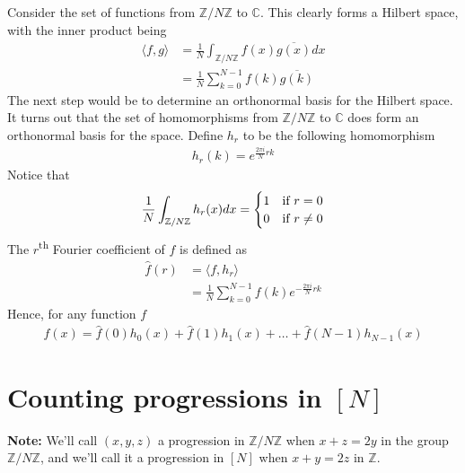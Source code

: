\documentclass[12pt]{article}
\theoremstyle{definition}
\newcommand{\znz}{\mathbb{Z}/N\mathbb{Z}}
\newcommand{\iprod}[2]{\langle #1, #2 \rangle}
\begin{document}
Consider the set of functions from $\znz$ to $\mathbb{C}$. This clearly forms a Hilbert space, with the inner product being
\begin{align*}
   \iprod{f}{g} &= \frac{1}{N} \int_{\znz} f(x) \overline{g(x)} dx \\
   &= \frac{1}{N} \sum_{k=0}^{N-1} f(k) \overline{g(k)}
\end{align*}
The next step would be to determine an orthonormal basis for the Hilbert space. It turns out that the set of homomorphisms from $\znz$ to $\mathbb{C}$ does form an orthonormal basis for the space. Define $h_r$ to be the following homomorphism
\begin{align*}
    h_r(k) = e^{\frac{2\pi i}{N}rk}
\end{align*}
Notice that
\begin{align*}
    \frac{1}{N}\int_{\znz} h_r(x) dx =
    \begin{cases}
        1 \hfill &\text{if $r=0$} \\
        0 \hfill &\text{if $r \neq 0$}
    \end{cases}
\end{align*}
The $r$\textsuperscript{th} Fourier coefficient of $f$ is defined as
\begin{align*}
    \widehat{f}(r) &= \iprod{f}{h_r}\\ 
    &= \frac{1}{N} \sum_{k=0}^{N-1} f(k) e^{-\frac{2\pi i}{N}rk} 
\end{align*}
Hence, for any function $f$
\begin{align*}
    f(x) = \widehat{f}(0) h_0(x) + \widehat{f}(1) h_1(x) + \ldots + \widehat{f}(N-1) h_{N-1}(x)
\end{align*}

\section{Counting progressions in $[N]$\cite{toronto}}
\textbf{Note:} We'll call $(x,y,z)$ a progression in $\znz$ when $x+z=2y$ in the group $\znz$, and we'll call it a progression in $[N]$ when $x+y=2z$ in $\mathbb{Z}$.
\end{document}
